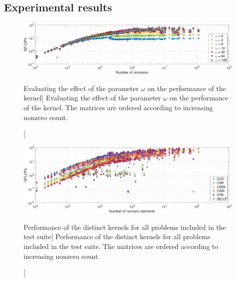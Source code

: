 \subsection{Experimental results}

\begin{figure}[t]
\begin{center}
\includegraphics[width=\columnwidth]{plots/COO_GFLOPS_nnz}
\end{center}
\caption
[Evaluating the effect of the parameter $\omega$ on the performance of the \coo
kernel]
{Evaluating the effect of the parameter $\omega$ on the performance of the \coo kernel. The matrices are ordered according to increasing nonzero count.}
\label{2017-coo-spmv:fig:COOanalysis}
\end{figure}

\begin{figure}[t]
\begin{center}
\includegraphics[width=\columnwidth]{plots/GFLOPS_all_nnz_nnz}
\end{center}
\caption
[Performance of the distinct \spmv kernels for all problems included in the test
suite]
{Performance of the distinct \spmv kernels for all problems included in the test suite. The matrices are ordered according to increasing nonzero count.}
\label{2017-coo-spmv:fig:GFLOPsnnz}
\end{figure}


